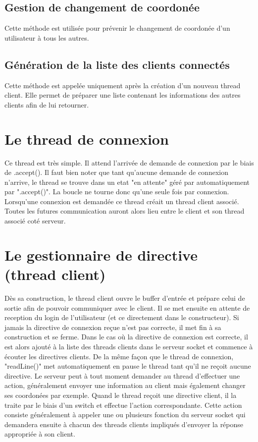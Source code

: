 \documentclass[a4paper,12pt]{report}
\begin{document}
      \subsection{Gestion de changement de coordonée}
        \medbreak
        Cette méthode est utilisée pour prévenir le changement de coordonée d'un utilisateur à tous les autres.

      \subsection{Génération de la liste des clients connectés}
        \medbreak
        Cette méthode est appelée uniquement après la création d'un nouveau thread client. Elle permet de préparer une liste contenant les informations des autres clients afin de lui retourner.

    \section{Le thread de connexion}
      Ce thread est très simple. Il attend l'arrivée de demande de connexion par le biais de .accept(). Il faut bien noter que tant qu'aucune demande de connexion n'arrive, le thread se trouve dans un etat "en attente" géré par automatiquement par ".accept()". La boucle ne tourne donc qu'une seule fois par connexion.
      \medbreak
      Lorsqu'une connexion est demandée ce thread créait un thread client associé. Toutes les futures communication auront alors lieu entre le client et son thread associé coté serveur.

    \section{Le gestionnaire de directive (thread client)}
      Dès sa construction, le thread client ouvre le buffer d'entrée et prépare celui de sortie afin de pouvoir communiquer avec le client. Il se met ensuite en attente de reception du login de l'utilisateur (et ce directement dans le constructeur). Si jamais la directive de connexion reçue n'est pas correcte, il met fin à sa construction et se ferme.
      \medbreak
      Dans le cas où la directive de connexion est correcte, il est alors ajouté à la liste des threads clients dans le serveur socket et commence à écouter les directives clients. De la même façon que le thread de connexion, "readLine()" met automatiquement en pause le thread tant qu'il ne reçoit aucune directive. 
      \medbreak
      Le serveur peut à tout moment demander au thread d'effectuer une action, généralement envoyer une information au client mais également changer ses coordonées par exemple. 
      \medbreak
      Quand le thread reçoit une directive client, il la traite par le biais d'un switch et effectue l'action correspondante. Cette action consiste généralement à appeler une ou plusieurs fonction du serveur socket qui demandera ensuite à chacun des threads clients impliqués d'envoyer la réponse appropriée à son client.
\end{document}
